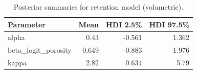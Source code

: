 \begin{table}
\caption{Posterior summaries for retention model (volumetric).}
\label{tab:retention_volumetric}
\begin{tabular}{lrrr}
\toprule
Parameter & Mean & HDI 2.5\% & HDI 97.5\% \\
\midrule
alpha & 0.43 & -0.561 & 1.362 \\
beta\_logit\_porosity & 0.649 & -0.883 & 1.976 \\
kappa & 2.82 & 0.634 & 5.79 \\
\bottomrule
\end{tabular}
\end{table}
